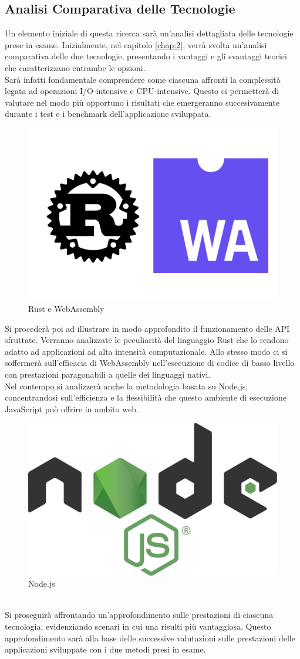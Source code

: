 \subsection{Analisi Comparativa delle Tecnologie}
Un elemento iniziale di questa ricerca sarà un'analisi dettagliata delle tecnologie prese in esame. 
Inizialmente, nel capitolo \ref{chap:2}, verrà svolta un'analisi comparativa delle due tecnologie, presentando i vantaggi e gli svantaggi teorici che caratterizzano entrambe le opzioni.
\\Sarà infatti fondamentale comprendere come ciascuna affronti la complessità legata ad operazioni I/O-intensive e CPU-intensive. Questo ci permetterà di valutare nel modo più opportuno i risultati che emergeranno succesivamente durante i test e i benchmark dell'applicazione sviluppata.
\begin{figure}
        \begin{center}
                \includegraphics[width=0.4\columnwidth]{images/rustwasm.jpg}
        \end{center}
        \caption{Rust e WebAssembly}
        \label{fig:rustwasm}
\end{figure}
\newpage
Si procederà poi ad illustrare in modo approfondito il funzionamento delle API sfruttate. Verranno analizzate le peculiarità del linguaggio Rust che lo rendono adatto ad applicazioni ad alta intensità computazionale. Allo stesso modo ci si soffermerà sull'efficacia di WebAssembly nell'esecuzione di codice di basso livello con prestazioni paragonabili a quelle dei linguaggi nativi.
\\Nel contempo si analizzerà anche la metodologia basata su Node.js, concentrandosi sull'efficienza e la flessibilità che questo ambiente di esecuzione JavaScript può offrire in ambito web.
\begin{figure}
        \begin{center}
                \includegraphics[width=0.3\columnwidth]{images/node.png}
        \end{center}
        \caption{Node.js}
        \label{fig:nodejs}
\end{figure} 
\\Si proseguirà affrontando un'approfondimento sulle prestazioni di ciascuna tecnologia, evidenziando scenari in cui una risulti più vantaggiosa. Questo approfondimento sarà alla base delle successive valutazioni sulle prestazioni delle applicazioni sviluppate con i due metodi presi in esame.

